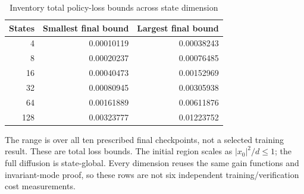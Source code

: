 \begin{table}[htbp]\centering\small
\caption{Inventory total policy-loss bounds across state dimension}\label{tab:suppinventorydimension}
\begin{tabular}{rrr}
\toprule
States & Smallest final bound & Largest final bound\\\midrule
4 & 0.00010119 & 0.00038243\\
8 & 0.00020237 & 0.00076485\\
16 & 0.00040473 & 0.00152969\\
32 & 0.00080945 & 0.00305938\\
64 & 0.00161889 & 0.00611876\\
128 & 0.00323777 & 0.01223752\\
\bottomrule\end{tabular}
\par\smallskip\footnotesize The range is over all ten prescribed final checkpoints, not a selected training result. These are total loss bounds. The initial region scales as $|x_0|^2/d\leq1$; the full diffusion is state-global. Every dimension reuses the same gain functions and invariant-mode proof, so these rows are not six independent training/verification cost measurements.
\end{table}
